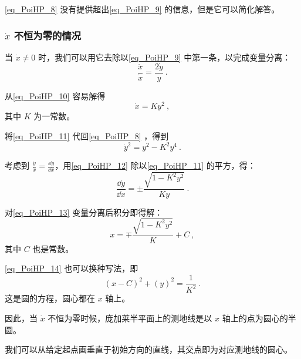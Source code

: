 \autoref{eq_PoiHP_8} 没有提供超出\autoref{eq_PoiHP_9} 的信息，但是它可以简化解答。

\subsubsection{$\dot{x}$ 不恒为零的情况}

{}%

当 $\dot{x}\ne 0$ 时，我们可以用它去除以\autoref{eq_PoiHP_9} 中第一条，以完成变量分离：
\begin{equation}\label{eq_PoiHP_10}
\frac{\ddot{x}}{\dot{x}}=\frac{2\dot{y}}{y}~.
\end{equation}

从\autoref{eq_PoiHP_10} 容易解得
\begin{equation}\label{eq_PoiHP_11}
\dot{x}=Ky^2~,
\end{equation}
其中 $K$ 为一常数。

将\autoref{eq_PoiHP_11} 代回\autoref{eq_PoiHP_8} ，得到
\begin{equation}\label{eq_PoiHP_12}
\dot{y}^2=y^2-K^2y^4~.
\end{equation}

考虑到 $\frac{\dot{y}}{\dot{x}}=\frac{\dd y}{\dd x}$，用\autoref{eq_PoiHP_12} 除以\autoref{eq_PoiHP_11} 的平方，得：
\begin{equation}\label{eq_PoiHP_13}
\frac{\dd y}{\dd x}=\pm\frac{\sqrt{1-K^2y^2}}{Ky}~.
\end{equation}

对\autoref{eq_PoiHP_13} 变量分离后积分即得解：
\begin{equation}\label{eq_PoiHP_14}
x=\mp\frac{\sqrt{1-K^2y^2}}{K}+C~,
\end{equation}
其中 $C$ 也是常数。

\autoref{eq_PoiHP_14} 也可以换种写法，即
\begin{equation}
(x-C)^2+(y)^2=\frac{1}{K^2}~.
\end{equation}
这是圆的方程，圆心都在 $x$ 轴上。

因此，当 $\dot{x}$ 不恒为零时候，庞加莱半平面上的测地线是以 $x$ 轴上的点为圆心的半圆。

我们可以从给定起点画垂直于初始方向的直线，其交点即为对应测地线的圆心。

